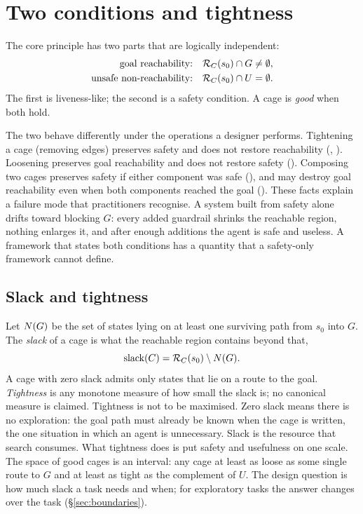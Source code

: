 \section{Two conditions and tightness}
\label{sec:conditions}

The core principle has two parts that are logically independent:
\begin{align}
\text{goal reachability:} \quad & \mathcal{R}_{C}(s_0) \cap G \neq \emptyset, \label{eq:goal}\\
\text{unsafe non-reachability:} \quad & \mathcal{R}_{C}(s_0) \cap U = \emptyset. \label{eq:safe}
\end{align}
The first is liveness-like; the second is a safety condition. A cage is \emph{good} when both hold.

The two behave differently under the operations a designer performs. Tightening a cage (removing edges) preserves safety and does not restore reachability (, ). Loosening preserves goal reachability and does not restore safety (). Composing two cages preserves safety if either component was safe (), and may destroy goal reachability even when both components reached the goal (). These facts explain a failure mode that practitioners recognise. A system built from safety alone drifts toward blocking $G$: every added guardrail shrinks the reachable region, nothing enlarges it, and after enough additions the agent is safe and useless. A framework that states both conditions has a quantity that a safety-only framework cannot define.

\subsection{Slack and tightness}
\label{sec:slack}

Let $N(G)$ be the set of states lying on at least one surviving path from $s_0$ into $G$. The \emph{slack} of a cage is what the reachable region contains beyond that,
\begin{equation}
\mathrm{slack}(C) = \mathcal{R}_{C}(s_0) \setminus N(G) .
\label{eq:slack}
\end{equation}
A cage with zero slack admits only states that lie on a route to the goal. \emph{Tightness} is any monotone measure of how small the slack is; no canonical measure is claimed. Tightness is not to be maximised. Zero slack means there is no exploration: the goal path must already be known when the cage is written, the one situation in which an agent is unnecessary. Slack is the resource that search consumes. What tightness does is put safety and usefulness on one scale. The space of good cages is an interval: any cage at least as loose as some single route to $G$ and at least as tight as the complement of $U$. The design question is how much slack a task needs and when; for exploratory tasks the answer changes over the task (\S\ref{sec:boundaries}).

